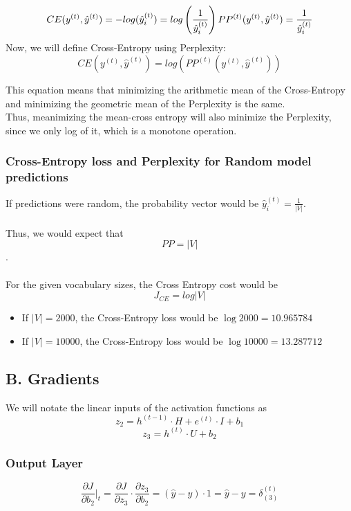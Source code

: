 \documentclass{article}
\begin{document}
$$
CE(y^{(t)} , \hat y^{(t)} ) = -log(\hat y_i^{(t)}) = log \left(\frac {1} {\hat y_i^{(t)}}\right) \\
PP^{(t)}(y^{(t)} , \hat y^{(t)} ) = \frac {1} {\hat y_i^{(t)}}
$$
Now, we will define Cross-Entropy using Perplexity:
$$
CE(y^{(t)} , \hat y^{(t)} ) = log (PP^{(t)}(y^{(t)} , \hat y^{(t)} ))
$$

This equation means that minimizing the arithmetic mean of the Cross-Entropy and minimizing the geometric mean of the Perplexity is the same.\\

Thus, meanimizing the mean-cross entropy will also minimize the Perplexity, since we only log of it, which is a monotone operation.

\subsubsection*{Cross-Entropy loss and Perplexity for \textbf{Random} model predictions}
If predictions were random, the probability vector would be $\hat y_i^{(t)} = \frac {1} {|V|} $. \\~\\
Thus, we would expect that $$ PP = |V| $$. \\~\\
For the given vocabulary sizes, the Cross Entropy cost would be $$ J_{CE} =  log |V| $$
\begin{itemize}
\item If $|V| = 2000$, the Cross-Entropy loss would be $  \log 2000 =  10.965784$
\item If $|V| = 10000$, the Cross-Entropy loss would be $ \log 10000 = 13.287712 $
\end{itemize}


\subsection*{B. Gradients}
 We will notate the linear inputs of the activation functions as $$ z_2 = h^{(t-1)}\cdot H + e^{(t)}\cdot I+ b_1 $$ $$ z_3 = h^{(t)} \cdot U + b_2$$

\subsubsection*{Output Layer}
$$
	\frac {\partial J}{\partial b_2} \Big|_t = \frac {\partial J}{\partial z_3} \cdot \frac {\partial z_3}{\partial b_2} = (\hat y - y) \cdot 1 = \hat y - y = \delta_{(3)}^{(t)}
$$
\end{document}
